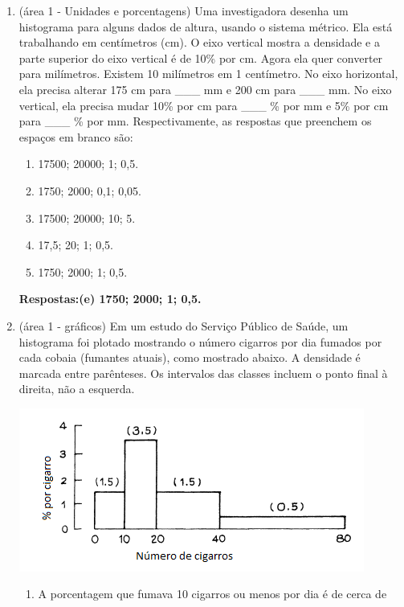 \documentclass[12pt]{article}\documentclass[brazilian,12pt,a4paper,final]{article}
\begin{document}
\begin{enumerate}
\item (área 1 - Unidades e porcentagens) Uma investigadora desenha um histograma para alguns dados de altura, usando o sistema métrico.
Ela está trabalhando em centímetros (cm). O eixo vertical mostra a densidade e a parte superior
do eixo vertical é de 10\% por cm. Agora ela quer converter para milímetros. Existem 10 milímetros em 1 centímetro. No eixo horizontal, ela precisa
alterar 175 cm para \_\_\_ mm e 200 cm para \_\_\_ mm. No eixo vertical,
ela precisa mudar 10\% por cm para \_\_\_ \% por mm e 5\% por
cm para \_\_\_ \% por mm.
Respectivamente, as respostas que preenchem os espaços em branco são:
\begin{enumerate}[label=(\alph*)]
\item 17500; 20000; 1; 0,5.
\item 1750; 2000; 0,1; 0,05.
\item 17500; 20000; 10; 5.
\item 17,5; 20; 1; 0,5.
\item 1750; 2000; 1; 0,5.
\end{enumerate}

\textbf{Respostas:(e) 1750; 2000; 1; 0,5.}


\item (área 1 - gráficos) Em um estudo do Serviço Público de Saúde, um histograma foi plotado mostrando o número
cigarros por dia fumados por cada cobaia (fumantes atuais), como mostrado
abaixo. A densidade é marcada entre parênteses. Os intervalos das classes incluem o ponto final à direita, não a esquerda.

 \includegraphics{Figuras/3C4.png}
\begin{enumerate}[label=(\Roman*)]
\item A porcentagem que fumava 10 cigarros ou menos por dia é de cerca de



\end{enumerate}
\end{enumerate}
\end{document}
